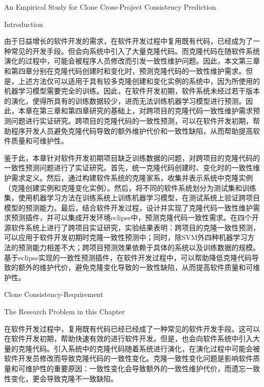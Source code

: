 
{An Empirical Study for Clone Cross-Project Consistency Prediction}

{Introduction}

由于日益增长的软件开发的需求，在软件开发过程中复用既有代码，已经成为了一种常见的开发手段。但会向系统中引入了大量克隆代码。而克隆代码在随软件系统演化的过程中，可能会被程序人员修改而引发一致性维护问题。因此，本文第三章和第四章分别在克隆代码创建时和变化时，预测克隆代码的一致性维护需求。但是，上述方法仅可以适用于具有较多克隆创建和变化实例的系统中，因为所使用的机器学习模型需要完全的训练。因此，在软件开发初期，软件系统未经过若干版本的演化，使得所具有的训练数据较少，进而无法训练机器学习模型进行预测。因此，本章在第三章和第四章研究的基础上，对跨项目的克隆代码一致性维护需求预测问题进行实证研究。跨项目的克隆代码的一致性预测，可以在软件开发初期，帮助程序开发人员避免克隆代码导致的额外维护代价和一致性缺陷，从而帮助提高软件质量和可维护性。

鉴于此，本章针对软件开发初期项目缺乏训练数据的问题，对跨项目的克隆代码的一致性预测问题进行了实证研究。首先，统一克隆代码创建时、变化时的一致性维护需求定义。然后，通过构建软件系统的克隆家系，收集并表示系统中克隆实例（克隆创建实例和克隆变化实例）。然后，将不同的软件系统划分为测试集和训练集，使用机器学习方法在训练系统上训练机器学习模型，在测试系统上验证跨项目模型的预测能力。最后，结合软件开发过程，设计并实现了克隆代码一致性维护需求预测插件，并可以集成开发环境eclipse中，预测克隆代码一致性需求。在四个开源软件系统上进行了跨项目实证研究，实验结果表明：跨项目的克隆一致性预测，可以应用于软件开发初期时克隆一致性预测中；同时，除SVM外四种机器学习方法的预测能力相差不大；跨项目预测效果依赖于具体的系统以及训练数据的规模。基于eclipse实现的一致性预测插件，在软件开发过程中，可以帮助降低克隆代码导致的额外的维护代价，避免克隆变化导致的一致性缺陷，从而提高软件质量和可维护性。

{Clone Consistency-Requirement}

{The Research Problem in this Chapter}

在软件开发过程中，复用既有代码已经已经成了一种常见的软件开发手段。这可以在软件开发初期，帮助快速有效的进行软件开发。但是，也会向软件系统中引入大量的克隆代码。引入系统中的克隆代码随着系统进行演化，在演化过程中可能会被软件开发员修改而导致克隆代码的一致性变化。克隆一致性变化问题是影响软件质量和可维护性的重要原因：一致性变化会导致额外的一致性维护代价，而遗忘一致性变化，更会导致克隆不一致缺陷。

